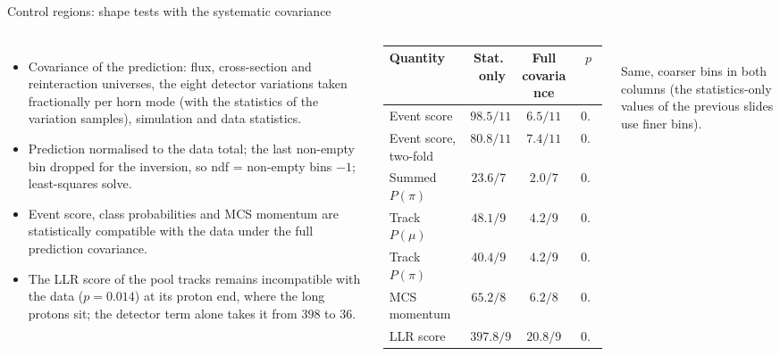\documentclass[aspectratio=169,10pt]{beamer}
\begin{document}
\begin{frame}{Control regions: shape tests with the systematic covariance}
  \begin{columns}[T]
  \begin{itemize}\footnotesize\setlength\itemsep{3pt}
    \item Covariance of the prediction: flux, cross-section and reinteraction universes, the eight detector
          variations taken fractionally per horn mode (with the statistics of the variation samples), simulation
          and data statistics.
    \item Prediction normalised to the data total; the last non-empty bin dropped for the inversion, so
          ndf = non-empty bins $-1$; least-squares solve.
    \item Event score, class probabilities and MCS momentum are statistically compatible with the data under the
          full prediction covariance.
    \item The LLR score of the pool tracks remains incompatible with the data ($p=0.014$) at its proton end, where
          the long protons sit; the detector term alone takes it from $398$ to $36$.
  \end{itemize}
  \scriptsize\setlength{\tabcolsep}{3pt}
  \begin{tabular}{lccc}
    \toprule
    Quantity & Stat.\ only & Full covariance & $p$ \\
    \midrule
    Event score & $98.5/11$ & $6.5/11$ & $0.84$ \\
    Event score, two-fold & $80.8/11$ & $7.4/11$ & $0.76$ \\
    Summed $P(\pi)$ & $23.6/7$ & $2.0/7$ & $0.96$ \\
    Track $P(\mu)$ & $48.1/9$ & $4.2/9$ & $0.90$ \\
    Track $P(\pi)$ & $40.4/9$ & $4.2/9$ & $0.90$ \\
    MCS momentum & $65.2/8$ & $6.2/8$ & $0.63$ \\
    LLR score & $397.8/9$ & $20.8/9$ & $0.014$ \\
    \bottomrule
  \end{tabular}\\[1mm]
  {\scriptsize Same, coarser bins in both columns (the statistics-only values of the previous slides use finer bins).}
  \end{columns}
\end{frame}
\end{document}
